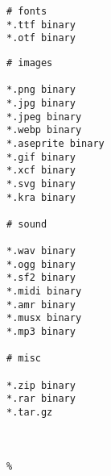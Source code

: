 \begin{itemize}[label=-]
\begin{minipage}{.45\textwidth}
\begin{lstlisting}
# fonts
*.ttf binary
*.otf binary
\end{lstlisting}
\end{minipage}\hfill
\begin{minipage}{.45\textwidth}
\begin{lstlisting}[escapechar=\%]
# images

*.png binary
*.jpg binary
*.jpeg binary
*.webp binary
*.aseprite binary
*.gif binary
*.xcf binary
*.svg binary
*.kra binary

# sound

*.wav binary
*.ogg binary
*.sf2 binary
*.midi binary
*.amr binary
*.musx binary
*.mp3 binary

# misc

*.zip binary
*.rar binary
*.tar.gz



%
\end{lstlisting}
\end{minipage}

\end{itemize}
